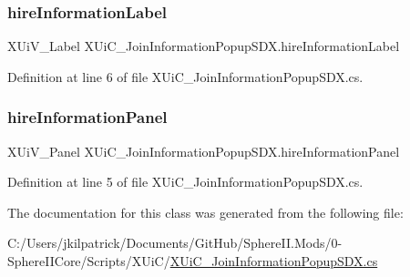 \subsubsection{\texorpdfstring{hireInformationLabel}{hireInformationLabel}}
{\footnotesize\ttfamily X\+Ui\+V\+\_\+\+Label X\+Ui\+C\+\_\+\+Join\+Information\+Popup\+S\+D\+X.\+hire\+Information\+Label}



Definition at line 6 of file X\+Ui\+C\+\_\+\+Join\+Information\+Popup\+S\+D\+X.\+cs.

\mbox{\label{class_x_ui_c___join_information_popup_s_d_x_a6a70d0fb5365be369bd36c8c84002861}} 
\subsubsection{\texorpdfstring{hireInformationPanel}{hireInformationPanel}}
{\footnotesize\ttfamily X\+Ui\+V\+\_\+\+Panel X\+Ui\+C\+\_\+\+Join\+Information\+Popup\+S\+D\+X.\+hire\+Information\+Panel}



Definition at line 5 of file X\+Ui\+C\+\_\+\+Join\+Information\+Popup\+S\+D\+X.\+cs.



The documentation for this class was generated from the following file\+:\begin{DoxyCompactItemize}
\item 
C\+:/\+Users/jkilpatrick/\+Documents/\+Git\+Hub/\+Sphere\+I\+I.\+Mods/0-\/\+Sphere\+I\+I\+Core/\+Scripts/\+X\+Ui\+C/\mbox{\hyperlink{_x_ui_c___join_information_popup_s_d_x_8cs}{X\+Ui\+C\+\_\+\+Join\+Information\+Popup\+S\+D\+X.\+cs}}\end{DoxyCompactItemize}
